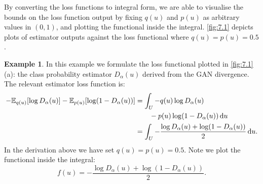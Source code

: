 \documentclass[honours,12pt, twoside]{unswthesis}
\newcommand{\E}{\mathbb{E}}
\numberwithin{equation}{section}
\theoremstyle{definition}
\newtheorem{example}[theorem]{Example}
\begin{document}
By converting the loss functions to integral form, we are able to visualise the bounds on the loss function output by fixing $q(u)$ and $p(u)$ as arbitrary values in $(0,1)$, and plotting the functional inside the integral. \autoref{fig:7.1} depicts plots of estimator outputs against the loss functional where $q(u)=p(u)=0.5$.
\begin{example}
In this example we formulate the loss functional plotted in \autoref{fig:7.1} (a): the class probability estimator $D_\alpha(u)$ derived from the GAN divergence. The relevant estimator loss function is:
\begin{align*}
-\E_{q(u)}[\log D_\alpha(u)]-\E_{p(u)}[\log (1-D_\alpha(u))]&=\int_U -q(u)\log D_\alpha(u)\\
&\quad \quad -p(u)\log(1-D_\alpha(u)) \,{\rm d}u\\
&=\int_U -\frac{\log D_\alpha(u)+\log(1-D_\alpha(u))}{2}\,{\rm d}u.
\end{align*}
In the derivation above we have set $q(u)=p(u)=0.5$. Note we plot the functional inside the integral:
\[f(u)=-\frac{\log D_\alpha(u)+\log(1-D_\alpha(u))}{2}.\]
\end{example}
\end{document}
